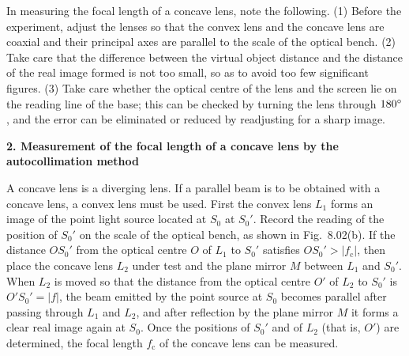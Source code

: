 In measuring the focal length of a concave lens, note the following. (1) Before the experiment, adjust the lenses so that the convex lens and the concave lens are coaxial and their principal axes are parallel to the scale of the optical bench. (2) Take care that the difference between the virtual object distance and the distance of the real image formed is not too small, so as to avoid too few significant figures. (3) Take care whether the optical centre of the lens and the screen lie on the reading line of the base; this can be checked by turning the lens through $180^{\circ}$, and the error can be eliminated or reduced by readjusting for a sharp image.

\textbf{2. Measurement of the focal length of a concave lens by the autocollimation method}

A concave lens is a diverging lens. If a parallel beam is to be obtained with a concave lens, a convex lens must be used. First the convex lens $L_1$ forms an image of the point light source located at $S_0$ at $S_0'$. Record the reading of the position of $S_0'$ on the scale of the optical bench, as shown in Fig.~8.02(b). If the distance $OS_0'$ from the optical centre $O$ of $L_1$ to $S_0'$ satisfies $OS_0'>|f_{\mathrm{c}}|$, then place the concave lens $L_2$ under test and the plane mirror $M$ between $L_1$ and $S_0'$. When $L_2$ is moved so that the distance from the optical centre $O'$ of $L_2$ to $S_0'$ is $O'S_0'=|f|$, the beam emitted by the point source at $S_0$ becomes parallel after passing through $L_1$ and $L_2$, and after reflection by the plane mirror $M$ it forms a clear real image again at $S_0$. Once the positions of $S_0'$ and of $L_2$ (that is, $O'$) are determined, the focal length $f_{\mathrm{c}}$ of the concave lens can be measured.

